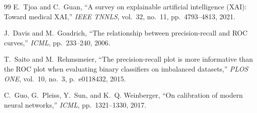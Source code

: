\documentclass[conference]{IEEEtran}
\begin{document}
\begin{thebibliography}{99}
E.~Tjoa and C.~Guan,
``A survey on explainable artificial intelligence (XAI): Toward medical XAI,''
\emph{IEEE TNNLS}, vol.~32, no.~11, pp.~4793--4813, 2021.

J.~Davis and M.~Goadrich,
``The relationship between precision-recall and ROC curves,'' \emph{ICML},
pp.~233--240, 2006.

T.~Saito and M.~Rehmsmeier,
``The precision-recall plot is more informative than the ROC plot when evaluating
binary classifiers on imbalanced datasets,'' \emph{PLOS ONE}, vol.~10, no.~3,
p.~e0118432, 2015.

C.~Guo, G.~Pleiss, Y.~Sun, and K.~Q. Weinberger,
``On calibration of modern neural networks,'' \emph{ICML}, pp.~1321--1330, 2017.

\end{thebibliography}
\end{document}

